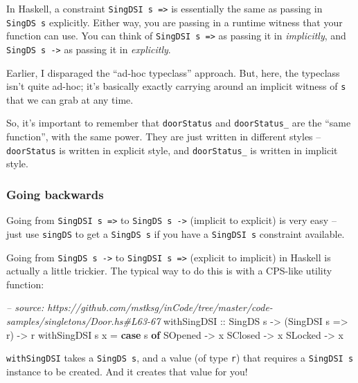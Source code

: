 \documentclass[]{article}
\newenvironment{Shaded}{}{}
\newcommand{\KeywordTok}[1]{\textcolor[rgb]{0.00,0.44,0.13}{\textbf{#1}}}
\newcommand{\DataTypeTok}[1]{\textcolor[rgb]{0.56,0.13,0.00}{#1}}
\newcommand{\CommentTok}[1]{\textcolor[rgb]{0.38,0.63,0.69}{\textit{#1}}}
\newcommand{\OtherTok}[1]{\textcolor[rgb]{0.00,0.44,0.13}{#1}}
\newcommand{\FunctionTok}[1]{\textcolor[rgb]{0.02,0.16,0.49}{#1}}
\newcommand{\NormalTok}[1]{#1}
\begin{document}
In Haskell, a constraint \texttt{SingDSI\ s\ =\textgreater{}} is essentially the
same as passing in \texttt{SingDS\ s} explicitly. Either way, you are passing in
a runtime witness that your function can use. You can think of
\texttt{SingDSI\ s\ =\textgreater{}} as passing it in \emph{implicitly}, and
\texttt{SingDS\ s\ -\textgreater{}} as passing it in \emph{explicitly}.

Earlier, I disparaged the ``ad-hoc typeclass'' approach. But, here, the
typeclass isn't quite ad-hoc; it's basically exactly carrying around an implicit
witness of \texttt{s} that we can grab at any time.

So, it's important to remember that \texttt{doorStatus} and
\texttt{doorStatus\_} are the ``same function'', with the same power. They are
just written in different styles -- \texttt{doorStatus} is written in explicit
style, and \texttt{doorStatus\_} is written in implicit style.

\subsubsection{Going backwards}\label{going-backwards}

Going from \texttt{SingDSI\ s\ =\textgreater{}} to
\texttt{SingDS\ s\ -\textgreater{}} (implicit to explicit) is very easy -- just
use \texttt{singDS} to get a \texttt{SingDS\ s} if you have a
\texttt{SingDSI\ s} constraint available.

Going from \texttt{SingDS\ s\ -\textgreater{}} to
\texttt{SingDSI\ s\ =\textgreater{}} (explicit to implicit) in Haskell is
actually a little trickier. The typical way to do this is with a CPS-like
utility function:

\begin{Shaded}
\begin{Highlighting}[]
\CommentTok{-- source: https://github.com/mstksg/inCode/tree/master/code-samples/singletons/Door.hs#L63-67}
\OtherTok{withSingDSI ::} \DataTypeTok{SingDS}\NormalTok{ s }\OtherTok{->}\NormalTok{ (}\DataTypeTok{SingDSI}\NormalTok{ s }\OtherTok{=>}\NormalTok{ r) }\OtherTok{->}\NormalTok{ r}
\NormalTok{withSingDSI s x }\FunctionTok{=} \KeywordTok{case}\NormalTok{ s }\KeywordTok{of}
    \DataTypeTok{SOpened} \OtherTok{->}\NormalTok{ x}
    \DataTypeTok{SClosed} \OtherTok{->}\NormalTok{ x}
    \DataTypeTok{SLocked} \OtherTok{->}\NormalTok{ x}
\end{Highlighting}
\end{Shaded}

\texttt{withSingDSI} takes a \texttt{SingDS\ s}, and a value (of type
\texttt{r}) that requires a \texttt{SingDSI\ s} instance to be created. And it
creates that value for you!
\end{document}
